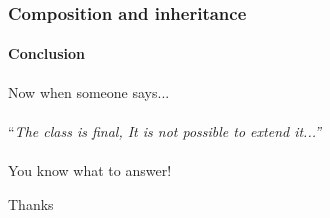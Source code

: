 \begin{frame}
    \frametitle{Composition and inheritance}
    \framesubtitle{Conclusion}

    Now when someone says...\\~\\\pause
    ``\textit{The class is final, It is not possible to extend it...''}\\~\\\pause
    You know what to answer!
\end{frame}

\begin{frame}
    \begin{center}
        \huge{Thanks}
    \end{center}
\end{frame}
